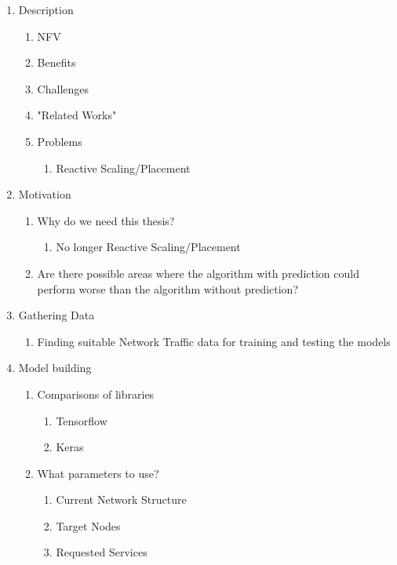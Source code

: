 \documentclass[10pt,a4paper]{article}
\begin{document}
	\begin{enumerate}[label*=\arabic*.]
		\item Description		
		\begin{enumerate}[label*=\arabic*.]
			\item NFV
			\item Benefits
			\item Challenges
			\item "Related Works"
			\item Problems
			\begin{enumerate}[label*=\arabic*.]
				\item Reactive Scaling/Placement
			\end{enumerate}
		\end{enumerate}	
		\item Motivation
		\begin{enumerate}[label*=\arabic*.]
			\item Why do we need this thesis?
			\begin{enumerate}[label*=\arabic*.]
				\item No longer Reactive Scaling/Placement
			\end{enumerate}
			\item Are there possible areas where the algorithm with prediction could perform worse than the algorithm without prediction?
		\end{enumerate}
		\item Gathering Data
		\begin{enumerate}[label*=\arabic*.]
			\item Finding suitable Network Traffic data for training and testing the models
		\end{enumerate}
		\item Model building
		\begin{enumerate}[label*=\arabic*.]
			\item Comparisons of libraries
			\begin{enumerate}[label*=\arabic*.]
				\item Tensorflow
				\item Keras
			\end{enumerate}
			\item What parameters to use?
			\begin{enumerate}[label*=\arabic*.]
				\item Current Network Structure
				\item Target Nodes
				\item Requested Services

\end{enumerate}
\end{enumerate}
\end{enumerate}
\end{document}
